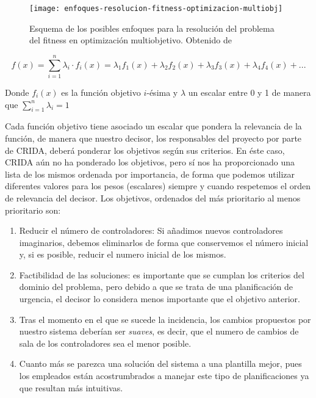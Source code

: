 \begin{figure}
	\centering
	\texttt{[image: enfoques-resolucion-fitness-optimizacion-multiobj]}
	\caption[Esquema de los posibles enfoques para la resolución del problema del fitness en optimización multiobjetivo]{Esquema de los posibles enfoques para la resolución del problema del fitness en optimización multiobjetivo. Obtenido de \cite{sota:metaheuristicas-design-impl}}
	\label{fig:enfoques-fitness-multiobj}
\end{figure}

\[
	f(x) = \sum_{i=1}^{n} \lambda_i \cdot f_i(x) = \lambda_1 f_1(x) + \lambda_2 f_2(x) + \lambda_3 f_3(x) + \lambda_4 f_4(x) + ...
\]

Donde $f_i(x)$ es la función objetivo $i$-ésima y $\lambda$ un escalar entre 0 y 1 de manera que $\sum_{i=1}^n \lambda_i = 1$

Cada función objetivo tiene asociado un escalar que pondera la relevancia de la función, de manera que nuestro decisor, los responsables del proyecto por parte de \gls{CRIDA}, deberá ponderar los objetivos según sus criterios. En éste caso, \gls{CRIDA} aún no ha ponderado los objetivos, pero sí nos ha proporcionado una lista de los mismos ordenada por importancia, de forma que podemos utilizar diferentes valores para los pesos (escalares) siempre y cuando respetemos el orden de relevancia del decisor. Los objetivos, ordenados del más prioritario al menos prioritario son:

\begin{enumerate}[label={O\arabic*}]
	\item \label{O1} Reducir el número de controladores: Si añadimos nuevos controladores imaginarios, debemos eliminarlos de forma que conservemos el número inicial y, si es posible, reducir el numero inicial de los mismos.
	
	\item \label{O2} Factibilidad de las soluciones: es importante que se cumplan los criterios del dominio del problema, pero debido a que se trata de una planificación de urgencia, el decisor lo considera menos importante que el objetivo anterior.
	
	\item \label{O3} Tras el momento en el que se sucede la incidencia, los cambios propuestos por nuestro sistema deberían ser \textit{suaves}, es decir, que el numero de cambios de sala de los controladores sea el menor posible.
	
	\item \label{O4} Cuanto más se parezca una solución del sistema a una plantilla mejor, pues los empleados están acostrumbrados a manejar este tipo de planificaciones ya que resultan más intuitivas.
\end{enumerate}

